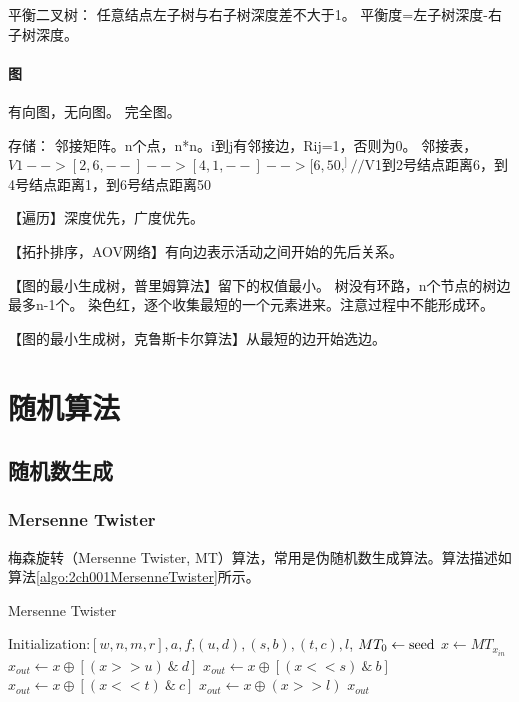 \documentclass[UTF8]{../computerUniverse}
\begin{document}
平衡二叉树：
任意结点左子树与右子树深度差不大于1。
平衡度=左子树深度-右子树深度。


\subsubsection{图}
有向图，无向图。
完全图。

存储：
邻接矩阵。n个点，n*n。i到j有邻接边，Rij=1，否则为0。
邻接表，$V1-->[2,6,--]-->[4,1,--]-->[6,50,^]//$V1到2号结点距离6，到4号结点距离1，到6号结点距离50

【遍历】深度优先，广度优先。

【拓扑排序，AOV网络】有向边表示活动之间开始的先后关系。

【图的最小生成树，普里姆算法】留下的权值最小。
树没有环路，n个节点的树边最多n-1个。
染色红，逐个收集最短的一个元素进来。注意过程中不能形成环。

【图的最小生成树，克鲁斯卡尔算法】从最短的边开始选边。




\chapter{随机算法}


\section{随机数生成}

\subsection{Mersenne Twister}
梅森旋转（Mersenne Twister, MT）算法，常用是伪随机数生成算法。算法描述如算法\ref{algo:2ch001MersenneTwister}所示。

      \begin{algorithm}[ht]
        \caption{Mersenne Twister}\label{algo:2ch001MersenneTwister}
        \SetAlgoLined
        Initialization:$[w, n, m, r], a, f$,$(u,d),(s,b),(t,c),l$, $MT_0 \leftarrow {\rm seed}$\;
        $x \leftarrow MT_{x_{in}}$\;
        $x_{out} \leftarrow x \oplus [ (x >> u) \ \& \  d]$\;
        $x_{out} \leftarrow x \oplus [ (x << s) \ \& \ b]$\;
        $x_{out} \leftarrow x \oplus [ (x << t) \ \& \  c]$\;
        $x_{out} \leftarrow x \oplus  (x >> l) $\;
        \KwRet $x_{out}$\;
      \end{algorithm}
\end{document}
